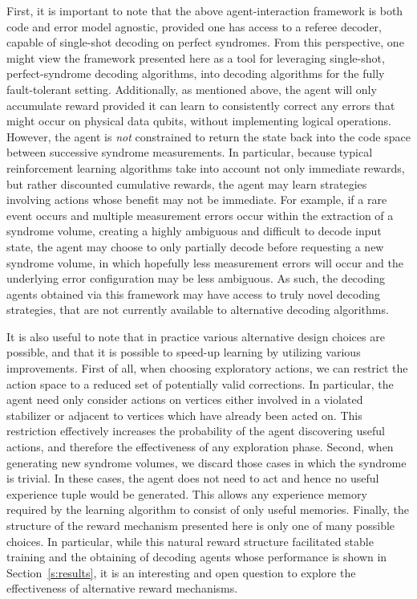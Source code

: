 \documentclass[twocolumn,preprintnumbers,amsmath,amssymb,notitlepage,nofootinbib,longbibliography,superscriptaddress,aps,pra,10pt]{revtex4-1}
\begin{document}
	First, it is important to note that the above agent-interaction framework is both code and error model agnostic, provided one has access to a referee decoder, capable of single-shot decoding on perfect syndromes.
	From this perspective, one might view the framework presented here as a tool for leveraging single-shot, perfect-syndrome decoding algorithms, into decoding algorithms for the fully fault-tolerant setting.
	Additionally, as mentioned above, the agent will only accumulate reward provided it can learn to consistently correct any errors that might occur on physical data qubits, without implementing logical operations.
	However, the agent is \textit{not} constrained to return the state back into the code space between successive syndrome measurements.
	In particular, because typical reinforcement learning algorithms take into account not only immediate rewards, but rather discounted cumulative rewards, the agent may learn strategies involving actions whose benefit may not be immediate.
	For example, if a rare event occurs and multiple measurement errors occur within the extraction of a syndrome volume, creating a highly ambiguous and difficult to decode input state, the agent may choose to only partially decode before requesting a new syndrome volume, in which hopefully less measurement errors will occur and the underlying error configuration may be less ambiguous.
	As such, the decoding agents obtained via this framework may have access to truly novel decoding strategies, that are not currently available to alternative decoding algorithms.

	It is also useful to note that in practice various alternative design choices are possible, and that it is possible to speed-up learning by utilizing various improvements.
	First of all, when choosing exploratory actions, we can restrict the action space to a reduced set of potentially valid corrections.
	In particular, the agent need only consider actions on vertices either involved in a violated stabilizer or adjacent to vertices which have already been acted on.
	This restriction effectively increases the probability of the agent discovering useful actions, and therefore the effectiveness of any exploration phase.
	Second, when generating new syndrome volumes, we discard those cases in which the syndrome is trivial.
	In these cases, the agent does not need to act and hence no useful experience tuple would be generated.
	This allows any experience memory required by the learning algorithm to consist of only useful memories.
	Finally, the structure of the reward mechanism presented here is only one of many possible choices.
	In particular, while this natural reward structure facilitated stable training and the obtaining of decoding agents whose performance is shown in Section~\ref{s:results}, it is an interesting and open question to explore the effectiveness of alternative reward mechanisms.
\end{document}
